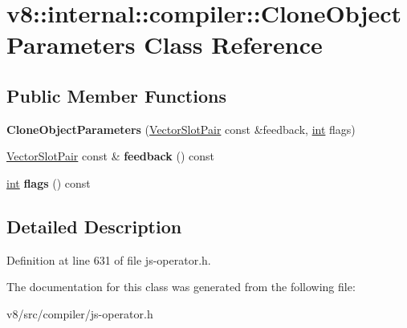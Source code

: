 \hypertarget{classv8_1_1internal_1_1compiler_1_1CloneObjectParameters}{}\section{v8\+:\+:internal\+:\+:compiler\+:\+:Clone\+Object\+Parameters Class Reference}
\label{classv8_1_1internal_1_1compiler_1_1CloneObjectParameters}
\subsection*{Public Member Functions}
\begin{DoxyCompactItemize}
\item 
\mbox{\label{classv8_1_1internal_1_1compiler_1_1CloneObjectParameters_a3a0fc7bf954a7596396493518ecf2aeb}} 
{\bfseries Clone\+Object\+Parameters} (\mbox{\hyperlink{classv8_1_1internal_1_1VectorSlotPair}{Vector\+Slot\+Pair}} const \&feedback, \mbox{\hyperlink{classint}{int}} flags)
\item 
\mbox{\label{classv8_1_1internal_1_1compiler_1_1CloneObjectParameters_a773d54fd5030eee429992f4b6a3c3811}} 
\mbox{\hyperlink{classv8_1_1internal_1_1VectorSlotPair}{Vector\+Slot\+Pair}} const  \& {\bfseries feedback} () const
\item 
\mbox{\label{classv8_1_1internal_1_1compiler_1_1CloneObjectParameters_a26347a5de680a0a6a05fa3cc315941b5}} 
\mbox{\hyperlink{classint}{int}} {\bfseries flags} () const
\end{DoxyCompactItemize}


\subsection{Detailed Description}


Definition at line 631 of file js-\/operator.\+h.



The documentation for this class was generated from the following file\+:\begin{DoxyCompactItemize}
\item 
v8/src/compiler/js-\/operator.\+h\end{DoxyCompactItemize}
